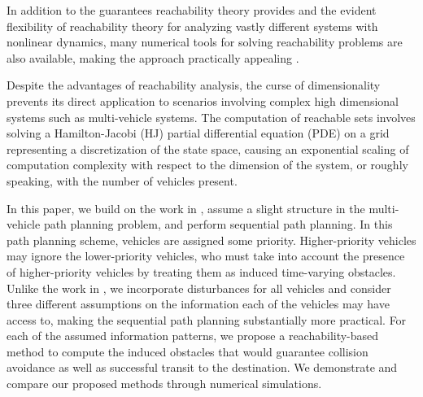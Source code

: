 In addition to the guarantees reachability theory provides and the evident flexibility of reachability theory for analyzing vastly different systems with nonlinear dynamics, many numerical tools for solving reachability problems are also available, making the approach practically appealing \cite{Mitchell05, Sethian96, Osher02, LSToolbox}.

Despite the advantages of reachability analysis, the curse of dimensionality prevents its direct application to scenarios involving complex high dimensional systems such as multi-vehicle systems. The computation of reachable sets involves solving a Hamilton-Jacobi (HJ) partial differential equation (PDE) on a grid representing a discretization of the state space, causing an exponential scaling of computation complexity with respect to the dimension of the system, or roughly speaking, with the number of vehicles present.

In this paper, we build on the work in \cite{Chen15}, assume a slight structure in the multi-vehicle path planning problem, and perform sequential path planning. In this path planning scheme, vehicles are assigned some priority. Higher-priority vehicles may ignore the lower-priority vehicles, who must take into account the presence of higher-priority vehicles by treating them as induced time-varying obstacles. Unlike the work in \cite{Chen15}, we incorporate disturbances for all vehicles and consider three different assumptions on the information each of the vehicles may have access to, making the sequential path planning substantially more practical. For each of the assumed information patterns, we propose a reachability-based method to compute the induced obstacles that would guarantee collision avoidance as well as successful transit to the destination. We demonstrate and compare our proposed methods through numerical simulations.